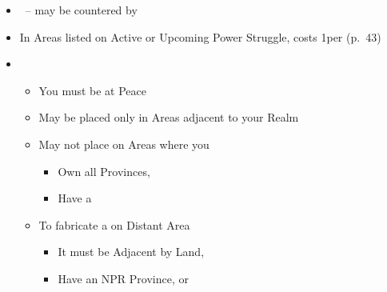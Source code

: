 \documentclass[10pt]{article}
\begin{document}
\begin{itemize}
	\item \covertaction~-- may be countered by 
	\item In Areas listed on Active or Upcoming Power Struggle, costs 1\diplopower per \claim (p.~43)
	\item {}
	\begin{itemize}
		\item You must be at Peace
		\item May be placed only in Areas adjacent to your Realm
		\item May not place \claim on Areas where you
		\begin{itemize}
			\item Own all Provinces,  
			\item Have a \claim
		\end{itemize}
		\item To fabricate a \claim on Distant Area
		\begin{itemize}
			\item It must be Adjacent by Land, 
			\item Have an NPR Province, \vassal or \town
		\end{itemize}
	\end{itemize}
\end{itemize}
\end{document}
